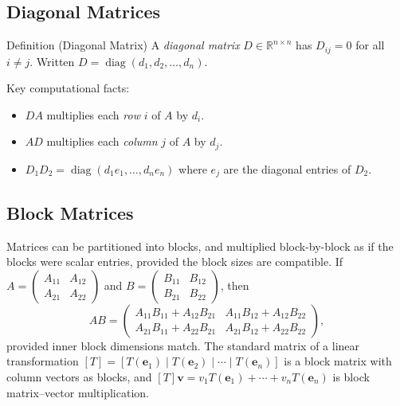 \subsection*{Diagonal Matrices}

\begin{propositionbox}{Definition (Diagonal Matrix)}
A \emph{diagonal matrix} $D \in \mathbb{R}^{n \times n}$ has $D_{ij} = 0$
for all $i \neq j$.
Written $D = \operatorname{diag}(d_1, d_2, \ldots, d_n)$.

Key computational facts:
\begin{itemize}
  \item $DA$ multiplies each \emph{row} $i$ of $A$ by $d_i$.
  \item $AD$ multiplies each \emph{column} $j$ of $A$ by $d_j$.
  \item $D_1 D_2 = \operatorname{diag}(d_1 e_1, \ldots, d_n e_n)$ where $e_j$ are the diagonal entries of $D_2$.
\end{itemize}
\end{propositionbox}

\subsection*{Block Matrices}

\begin{remark*}
Matrices can be partitioned into blocks, and multiplied block-by-block
as if the blocks were scalar entries, provided the block sizes are
compatible.
If $A = \begin{pmatrix} A_{11} & A_{12} \\ A_{21} & A_{22} \end{pmatrix}$
and $B = \begin{pmatrix} B_{11} & B_{12} \\ B_{21} & B_{22} \end{pmatrix}$,
then
\[
  AB = \begin{pmatrix}
    A_{11}B_{11} + A_{12}B_{21} & A_{11}B_{12} + A_{12}B_{22} \\
    A_{21}B_{11} + A_{22}B_{21} & A_{21}B_{12} + A_{22}B_{22}
  \end{pmatrix},
\]
provided inner block dimensions match.
The standard matrix of a linear transformation $[T] = [T(\mathbf{e}_1) \mid T(\mathbf{e}_2) \mid \cdots \mid T(\mathbf{e}_n)]$
is a block matrix with column vectors as blocks, and
$[T]\mathbf{v} = v_1 T(\mathbf{e}_1) + \cdots + v_n T(\mathbf{e}_n)$
is block matrix--vector multiplication.
\end{remark*}

